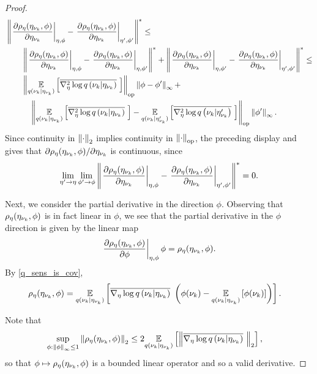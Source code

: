 \begin{thm}
\begin{proof}
%
\begin{align*}
%
\MoveEqLeft
%
\norm{\fracat{\partial \rho_\eta(\etanuk, \phi)}{\partial \etanuk}{\eta, \phi} -
      \fracat{\partial \rho_\eta(\etanuk, \phi)}{\partial \etanuk}{\eta', \phi'}
      }^* \le \\
%
& \norm{\fracat{\partial \rho_\eta(\etanuk, \phi)}{\partial \etanuk}{\eta, \phi} -
        \fracat{\partial \rho_\eta(\etanuk, \phi)}{\partial \etanuk}{\eta, \phi'}
    }^* +
\norm{\fracat{\partial \rho_\eta(\etanuk, \phi)}{\partial \etanuk}{\eta, \phi'} -
      \fracat{\partial \rho_\eta(\etanuk, \phi)}{\partial \etanuk}{\eta', \phi'}
    }^* \le \\
%
& \normop{
    \expect{\q(\nuk \vert \etanuk)}
           {\lqhessbar{\nuk \vert \etanuk}}
    } \norminf{\phi - \phi'} + \\&\quad
\normop{
    \expect{\q(\nuk \vert \etanuk)}{\lqhessbar{\nuk \vert \etanuk}} -
    \expect{\q(\nuk \vert \etanuk')}{\lqhessbar{\nuk \vert \etanuk'}}
  } \norminf{\phi'}.
%
\end{align*}
%
Since continuity in $\left\Vert\cdot\right\Vert_2$ implies continuity in $\left\Vert\cdot\right\Vert_{\mathrm{op}}$,
the preceding display and  gives that
$\partial \rho_\eta(\eta_{\nu_{k}}, \phi) / \partial \eta_{\nu_{k}}$ is continuous,
since
%
\begin{align*}
%
\lim_{\eta' \rightarrow \eta} \lim_{\phi' \rightarrow \phi}
\norm{\fracat{\partial \rho_\eta(\etanuk, \phi)}{\partial \etanuk}{\eta, \phi} -
      \fracat{\partial \rho_\eta(\etanuk, \phi)}{\partial \etanuk}{\eta', \phi'}
      }^* = 0.
%
\end{align*}

Next, we consider the partial derivative in the direction $\phi$.  Observing
that $\rho_\eta(\eta_{\nu_{k}}, \phi)$ is in fact linear in $\phi$, we see that the
partial derivative in the $\phi$ direction is given by the linear map
%
\begin{align*}
%
\fracat{\partial \rho_\eta(\etanuk, \phi)}{\partial \phi}{\eta, \phi} \phi =
    \rho_\eta(\etanuk, \phi).
%
\end{align*}
%
By  \eqref{q_sens_is_cov},
%
\begin{align*}
%
\rho_\eta(\etanuk, \phi) ={}&
\expect{\q(\nuk \vert \etanuk)}
       {\lqgradbar{\nuk \vert \etanuk} \left(
        \phi(\nuk) - \expect{\q(\nuk \vert \etanuk)}{\phi(\nuk)}
       \right)
       }.
%
\end{align*}
%


Note that
%
\begin{align*}
%
\sup_{\phi: \norminf{\phi} \le 1} \norm{\rho_\eta(\etanuk, \phi)}_2 \le{}&
    2 \expect{\q(\nuk \vert \etanuk)}
             {\norm{\lqgradbar{\nuk \vert \etanuk}}_2
             },
%
\end{align*}
%
so that $\phi \mapsto \rho_\eta(\eta_{\nu_{k}}, \phi)$ is a bounded linear operator and so
a valid derivative.


\end{proof}
\end{thm}
